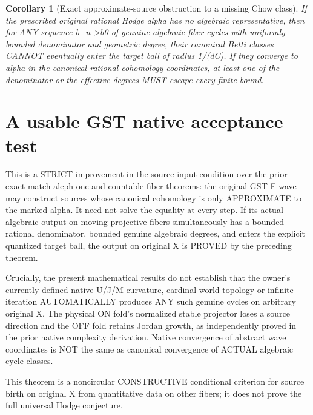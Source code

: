 \documentclass{article}
\newtheorem{corollary}{Corollary}
\begin{document}
\begin{corollary}[Exact approximate-source obstruction to a missing Chow class]
If the prescribed original rational Hodge alpha
has no algebraic representative, then for ANY
sequence b_n->b0 of genuine algebraic fiber
cycles with uniformly bounded denominator and
geometric degree, their canonical Betti classes
CANNOT eventually enter the target ball
of radius 1/(dC).
If they converge to alpha in the canonical
rational cohomology coordinates, at least one
of the denominator or the effective degrees
MUST escape every finite bound.
\end{corollary}

\section{A usable GST native acceptance test}
This is a STRICT improvement in the source-input condition
over the prior exact-match aleph-one and countable-fiber theorems:
the original GST F-wave may construct sources whose
canonical cohomology is only APPROXIMATE to the marked
alpha. It need not solve the equality at every step.
If its actual algebraic output on moving projective
fibers simultaneously has a bounded rational denominator,
bounded genuine algebraic degrees, and enters the explicit
quantized target ball, the output on original X is
PROVED by the preceding theorem.

Crucially, the present mathematical results do not
establish that the owner's currently defined native U/J/M
curvature, cardinal-world topology or infinite iteration
AUTOMATICALLY produces ANY such genuine cycles on
arbitrary original X.
The physical ON fold's normalized stable projector
loses a source direction and the OFF fold retains
Jordan growth, as independently proved in the prior
native complexity derivation. Native convergence
of abstract wave coordinates is NOT the same as
canonical convergence of ACTUAL algebraic cycle classes.

This theorem is a noncircular CONSTRUCTIVE conditional
criterion for source birth on original X from quantitative
data on other fibers; it does not prove the full universal
Hodge conjecture.
\end{document}
